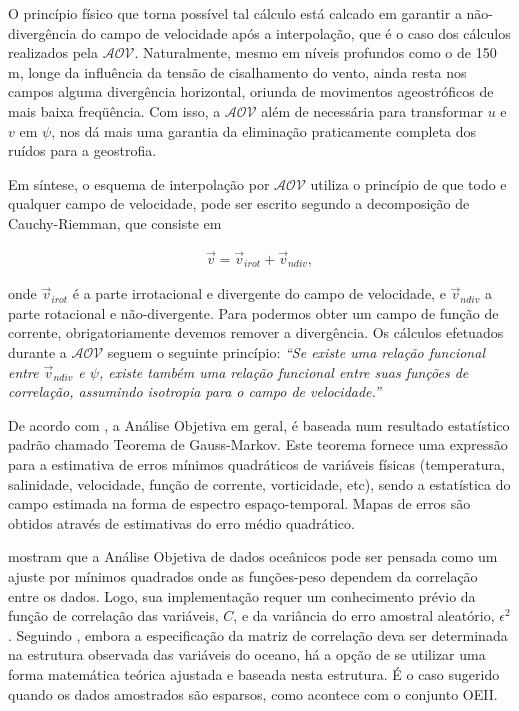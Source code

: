 \documentclass[12pt,portuguese,a4paper,pdftex]{article}
\begin{document}
O princípio físico que torna possível tal cálculo está calcado em garantir a não-divergência do campo de velocidade 
após a interpolação, que é o caso dos cálculos realizados pela $\mathcal{AOV}$.
Naturalmente, mesmo em níveis profundos como o de 150 m,
longe da influência da tensão de cisalhamento do vento, ainda resta nos campos alguma divergência horizontal, 
oriunda de movimentos ageostróficos de mais baixa freq\"uência. Com isso, a $\mathcal{AOV}$ além de necessária
para transformar $u$ e $v$ em $\psi$, nos dá mais uma garantia da eliminação praticamente completa dos ruídos
para a geostrofia. 

Em síntese, o esquema de interpolação por $\mathcal{AOV}$ utiliza o princípio de que todo e qualquer campo
 de velocidade, pode ser escrito segundo a decomposição de Cauchy-Riemman, que consiste em 

\begin{eqnarray}
\vec{v} = \vec{v}_{irot} + \vec{v}_{ndiv},
\label{eq:cauchyriemman}
\end{eqnarray}

onde $\vec{v}_{irot}$ é a parte irrotacional e divergente do campo de velocidade, e $\vec{v}_{ndiv}$ a parte 
rotacional e não-divergente. Para podermos obter um campo de função de corrente, obrigatoriamente devemos
remover a divergência.  Os cálculos efetuados durante a $\mathcal{AOV}$ seguem o seguinte princípio:
{\it ``Se existe uma relação funcional entre $\vec{v}_{ndiv}$ e $\psi$, existe também uma relação funcional 
entre suas funções de correlação, assumindo isotropia para o campo de velocidade.''} 

De acordo com 
\cite{bretherton_etal1976}, a Análise Objetiva em geral, é baseada num resultado estatístico padrão chamado Teorema 
de Gauss-Markov. Este teorema fornece uma expressão para a estimativa de erros mínimos 
quadráticos de variáveis físicas (temperatura, salinidade, velocidade, função de corrente, 
vorticidade, etc), sendo a estatística do campo estimada na forma de espectro espaço-temporal. 
Mapas de erros são obtidos através de estimativas do erro médio quadrático. 

\cite{carter_robinson1987} mostram que a Análise Objetiva de dados oceânicos pode ser pensada 
como um ajuste por mínimos quadrados onde as funções-peso dependem da correlação entre os dados. 
Logo, sua implementação requer um conhecimento prévio da função de correlação das 
variáveis, $C$, e da variância do erro amostral aleatório, $\epsilon^2$. Seguindo 
\cite{emery_thomson1998}, embora a especificação da matriz de correlação deva ser determinada na 
estrutura observada das variáveis do oceano, há a opção de se utilizar uma forma matemática teórica 
ajustada e baseada nesta estrutura. É o caso sugerido quando os dados amostrados são esparsos, 
como acontece com o conjunto OEII.
\end{document}
